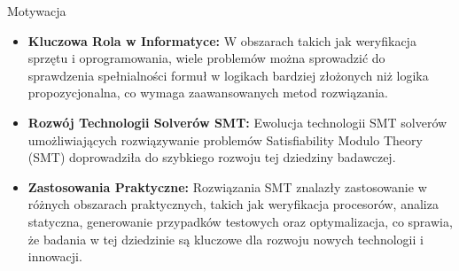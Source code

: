 \begin{frame}{Motywacja}
	\begin{itemize}
		\item \textbf{Kluczowa Rola w Informatyce:} W obszarach takich jak weryfikacja sprzętu i oprogramowania, wiele problemów można sprowadzić do sprawdzenia spełnialności formuł w logikach bardziej złożonych niż logika propozycjonalna, co wymaga zaawansowanych metod rozwiązania.
		
		\item \textbf{Rozwój Technologii Solverów SMT:} Ewolucja technologii SMT solverów umożliwiających rozwiązywanie problemów Satisfiability Modulo Theory (SMT) doprowadziła do szybkiego rozwoju tej dziedziny badawczej.
		
		\item \textbf{Zastosowania Praktyczne:} Rozwiązania SMT znalazły zastosowanie w różnych obszarach praktycznych, takich jak weryfikacja procesorów, analiza statyczna, generowanie przypadków testowych oraz optymalizacja, co sprawia, że badania w tej dziedzinie są kluczowe dla rozwoju nowych technologii i innowacji.
	\end{itemize}	
\end{frame}